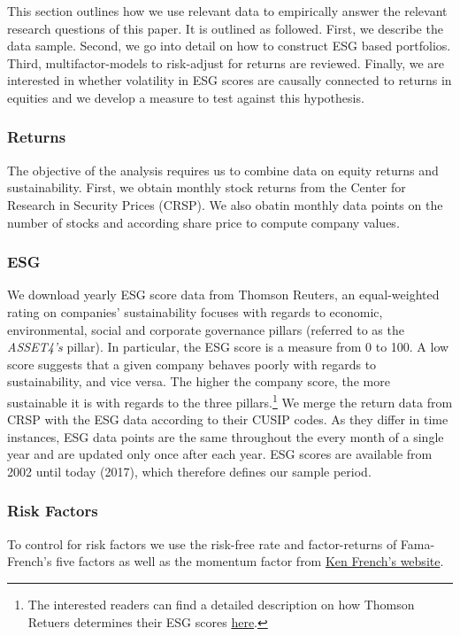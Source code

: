 \documentclass[11pt]{article}
\begin{document}
This section outlines how we use relevant data to empirically answer the relevant research questions of this paper. It is outlined as followed. First, we describe the data sample. Second, we go into detail on how to construct ESG based portfolios. Third, multifactor-models to risk-adjust for returns are reviewed. Finally, we are interested in whether volatility in ESG scores are causally connected to returns in equities and we develop a measure to test against this hypothesis.

\subsubsection*{Returns}

The objective of the analysis requires us to combine data on equity returns and sustainability. First, we obtain monthly stock returns from the Center for Research in Security Prices (CRSP). We also obatin monthly data points on the number of stocks and according share price to compute company values.

\subsubsection*{ESG}
We download yearly ESG score data from Thomson Reuters, an equal-weighted rating on companies' sustainability focuses with regards to economic, environmental, social and corporate governance pillars (referred to as the \textit{ASSET4's} pillar). In particular, the ESG score is a measure from 0 to 100. A low score suggests that a given company behaves poorly with regards to sustainability, and vice versa. The higher the company score, the more sustainable it is with regards to the three pillars.\footnote{The interested readers can find a detailed description on how Thomson Retuers determines their ESG scores \href{http://www.esade.edu/itemsweb/biblioteca/bbdd/inbbdd/archivos/Thomson_Reuters_ESG_Scores.pdf}{here}.} We merge the return data from CRSP with the ESG data according to their CUSIP codes. As they differ in time instances, ESG data points are the same throughout the every month of a single year and are updated only once after each year. ESG scores are available from 2002 until today (2017), which therefore defines our sample period.

\subsubsection*{Risk Factors}
To control for risk factors we use the risk-free rate and factor-returns of Fama-French's five factors as well as the momentum factor from \href{https://mba.tuck.dartmouth.edu/pages/faculty/ken.french/data_library.html}{Ken French's website}.
\end{document}
